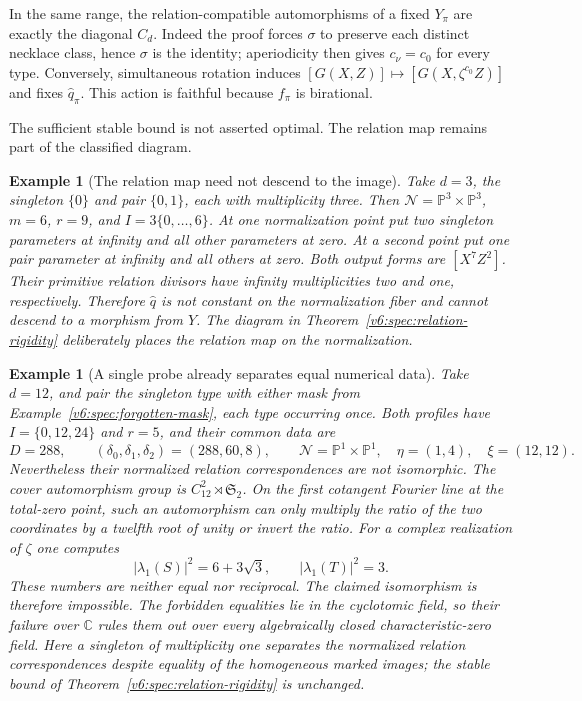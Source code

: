 \documentclass[10pt,fleqn]{article}
\numberwithin{equation}{section}
\newtheorem{example}[theorem]{Example}
\newcommand{\PP}{\mathbb P}
\begin{document}
In the same range, the relation-compatible automorphisms of a fixed
$Y_\pi$ are exactly the diagonal $C_d$.  Indeed the proof forces
$\sigma$ to preserve each distinct necklace class, hence $\sigma$ is
the identity; aperiodicity then gives $c_\nu=c_0$ for every type.
Conversely, simultaneous rotation induces
$[G(X,Z)]\mapsto[G(X,\zeta^{c_0}Z)]$ and fixes $\widehat q_\pi$.
This action is faithful because $f_\pi$ is birational.

The sufficient stable bound is not asserted optimal.  The relation
map remains part of the classified diagram.

\begin{example}[The relation map need not descend to the image]
\label{v6:spec:no-relation-descent}
Take $d=3$, the singleton $\{0\}$ and pair $\{0,1\}$, each with
multiplicity three.  Then
$\mathcal N=\PP^3\times\PP^3$, $m=6$, $r=9$, and
$I=3\{0,\ldots,6\}$.  At one normalization point put two singleton
parameters at infinity and all other parameters at zero.  At a second
point put one pair parameter at infinity and all others at zero.
Both output forms are $[X^7Z^2]$.  Their primitive relation divisors
have infinity multiplicities two and one, respectively.  Therefore
$\widehat q$ is not constant on the normalization fiber and cannot
descend to a morphism from $Y$.  The diagram in
Theorem~\ref{v6:spec:relation-rigidity} deliberately places the relation
map on the normalization.
\end{example}

\begin{example}[A single probe already separates equal numerical data]
\label{v6:spec:small-probe}
Take $d=12$, and pair the singleton type with either mask from
Example~\ref{v6:spec:forgotten-mask}, each type occurring once.  Both
profiles have $I=\{0,12,24\}$ and $r=5$, and their common data are
\[
 D=288,\qquad (\delta_0,\delta_1,\delta_2)=(288,60,8),\qquad
 \mathcal N=\PP^1\times\PP^1,
 \quad \eta=(1,4),\quad\xi=(12,12).
\]
Nevertheless their normalized relation correspondences are not
isomorphic.  The cover automorphism group is
$C_{12}^2\rtimes\mathfrak S_2$.  On the first cotangent Fourier line
at the total-zero point, such an automorphism can only multiply the
ratio of the two coordinates by a twelfth root of unity or invert the
ratio.  For a complex realization of $\zeta$ one computes
\[
 |\lambda_1(S)|^2=6+3\sqrt3,\qquad
 |\lambda_1(T)|^2=3.
\]
These numbers are neither equal nor reciprocal.  The claimed
isomorphism is therefore impossible.  The forbidden equalities lie in the cyclotomic field, so their failure
over $\mathbb C$ rules them out over every algebraically closed
characteristic-zero field.
Here a singleton of multiplicity one separates the normalized
relation correspondences despite equality of the homogeneous
marked images; the stable bound of
Theorem~\ref{v6:spec:relation-rigidity} is unchanged.
\end{example}
\end{document}
